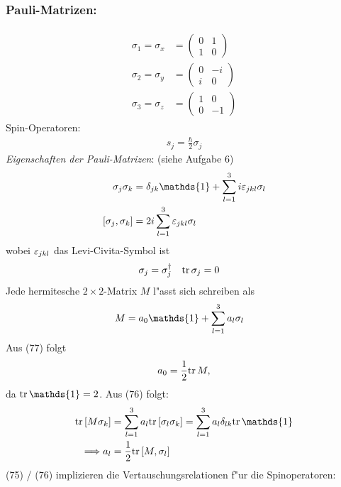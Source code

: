 \documentclass[a4paper]{scrartcl}
\newcommand{\dOne}{\ensuremath \mathds{1}}
\newcommand{\eps}{\ensuremath \varepsilon}
\newcommand{\tr}{\ensuremath \mathrm{tr} \, }
\begin{document}
{\subsubsection*{Pauli-Matrizen:}
\begin{align}
\begin{split}
\sigma_1 = \sigma_x & = \begin{pmatrix} 0 & 1 \\ 1& 0 \end{pmatrix} \\
\sigma_2 = \sigma_y & = \begin{pmatrix} 0 & -i \\ i & 0 \end{pmatrix} \\
\sigma_3 = \sigma_z & = \begin{pmatrix} 1 & 0 \\ 0& -1 \end{pmatrix}
\end{split}
\end{align}
Spin-Operatoren:
\begin{align}
s_j = \frac \hbar 2 \sigma_j
\end{align}
\emph{Eigenschaften der Pauli-Matrizen}: (siehe Aufgabe 6)
\begin{align}
\begin{split}
\sigma_j \sigma_k & = \delta_{jk} \dOne + \sum_{l=1}^3 i \eps_{jkl} \sigma_l \\
[\sigma_j, \sigma_k] & = 2i \sum_{l=1}^3 \eps_{jkl} \sigma_l
\end{split}
\end{align}
wobei $\eps_{jkl}$ das Levi-Civita-Symbol ist
\begin{align}
\sigma_j &  = \sigma_j^\dagger &  \tr \sigma_j & = 0
\end{align}
Jede hermitesche $2 \times 2$-Matrix $M$ l"asst sich schreiben als
\begin{align}
M & = a_0 \dOne + \sum_{l=1}^3 a_l \sigma_l
\end{align}
Aus (77) folgt
\begin{align}
a_0 = \frac12 \tr M, 
\end{align}
da $\tr \dOne = 2$. Aus (76) folgt:
\begin{align}
\tr [ M \sigma_k] & = \sum_{l=1}^3 a_l \tr [\sigma_l \sigma_k]  = \sum_{l=1}^3 a_l \delta_{lk} \tr \dOne \notag \\
\Longrightarrow a_l & = \frac12 \tr[M, \sigma_l]
\end{align}
(75) / (76) implizieren die Vertauschungsrelationen f"ur die Spinoperatoren:
}
\end{document}
